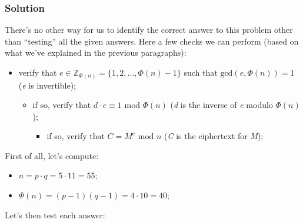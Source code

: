 \documentclass[11pt, a4paper]{article}
\newcommand{\doublequotes}[1]{“#1”}
\newcommand{\mymod}{
    \text{ mod }
}
\begin{document}
\subsubsection*{Solution}
There's no other way for us to identify the correct answer to this problem other than \doublequotes{testing} all the given answers. Here a few checks we can perform (based on what we've explained in the previous paragraphs):
\begin{itemize}
    \item verify that $e\in\mathbb{Z}_{\Phi(n)}=\{1,2,...,\Phi(n)-1\}$ such that $\text{gcd}(e,\Phi(n))=1$ (\textit{e} is invertible);
    \begin{itemize}
        \item if so, verify that $d\cdot e\equiv1\mymod\Phi(n)$ (\textit{d} is the inverse of \textit{e} modulo $\Phi(n)$);
        \begin{itemize}
            \item if so, verify that $C=M^e\mymod n$ (\textit{C} is the ciphertext for \textit{M});
        \end{itemize}
    \end{itemize}
\end{itemize}
First of all, let's compute:
\begin{itemize}
    \item $n=p\cdot q=5\cdot11=55$;
    \item $\Phi(n)=(p-1)(q-1)=4\cdot10=40$;
\end{itemize}
Let's then test each answer:
\end{document}

